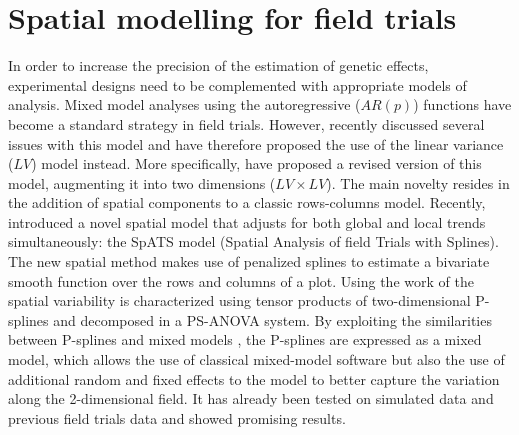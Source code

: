 \section{Spatial modelling for field trials}

In order to increase the precision of the estimation of genetic effects, experimental designs need to be complemented with appropriate models of analysis. Mixed model analyses using the autoregressive ($AR(p)$) functions   \parencite{cullis_spatial_1991} have become a standard strategy in field trials. 
However, \textcite{piepho_problems_2015} recently discussed several issues with this model and have therefore proposed the use of the linear variance ($LV$) model \parencite{williams_use_1988} instead. More specifically, \textcite{piepho_linear_2010} have proposed a revised version of this model, augmenting it into two dimensions ($LV \times LV$). The main novelty resides in the addition of spatial components to a classic rows-columns model. Recently, 
\textcite{rodriguez-alvarez_correcting_2018} introduced a novel spatial model that adjusts for both global and local trends simultaneously: the SpATS model  (Spatial Analysis of field Trials with Splines). The new spatial method makes use of penalized splines \parencite{eilers_flexible_1996} to estimate a bivariate smooth function over the rows and columns of a plot. Using the work of \textcite{lee_efficient_2013,lee_hwang_smoothing_2010,lee_p-spline_2011} the spatial variability is characterized using tensor products of two-dimensional P-splines \parencite{dierckx_curve_1995} and decomposed in a PS-ANOVA system. By exploiting the similarities between P-splines and mixed models \parencite{currie_flexible_2002,durban_adjusting_2001, wand_smoothing_2003}, the P-splines are expressed as a mixed model, which allows the use of classical mixed-model software but also the use of additional random and fixed effects to the model to better capture the variation along the 2-dimensional field.
It has already been tested on simulated data \parencite{rodriguez-alvarez_correcting_2018} and previous field trials data \parencite{lado_increased_2013} and showed promising results.\\

